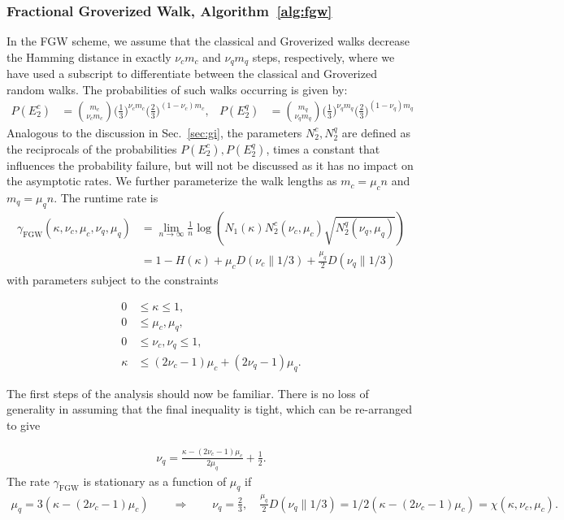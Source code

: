 \documentclass[a4paper,aps,floatfix]{revtex4}
\begin{document}
\subsubsection{Fractional Groverized Walk, Algorithm~\ref{alg:fgw}}

In the FGW scheme, we assume that the classical and Groverized walks decrease the Hamming distance in exactly $\nu_cm_c$ and $\nu_qm_q$ steps, respectively, where we have used a subscript to differentiate between the classical and Groverized random walks. 
The probabilities of such walks occurring is given by:
\begin{align}
    P(E^c_2) &= \binom{m_c}{\nu_c m_c}\Big(\frac13\Big)^{\nu_c m_c}\Big(\frac23\Big)^{(1-\nu_c)m_c},
    &
     P(E^q_2) &= \binom{m_q}{\nu_q m_q}\Big(\frac13\Big)^{\nu_q m_q}\Big(\frac23\Big)^{(1-\nu_q)m_q}
\end{align}
Analogous to the discussion in Sec.~\ref{sec:gi}, the parameters $N_2^c, N_2^q$ are defined as the reciprocals of the probabilities $P(E^c_2),P(E^q_2)$, times a constant that influences the probability failure, but will not be discussed as it has no impact on the asymptotic rates.
We further parameterize the walk lengths as $m_c = \mu_cn$ and $m_q = \mu_qn$. 
The runtime rate is
\begin{align}
    \gamma_{\textrm{FGW}}(\kappa,\nu_c,\mu_c,\nu_q,\mu_q) &= \lim_{n \rightarrow \infty} \frac1n \log\left(N_1(\kappa)N_2^c(\nu_c,\mu_c)\sqrt{N_2^q(\nu_q,\mu_q)}\right) \nonumber\\
    &= 
		1- H(\kappa) + \mu_cD(\nu_c\parallel 1/3) + 
		\frac{\mu_q}2D(\nu_q\parallel 1/3)
\end{align}
with parameters subject to the constraints

\begin{equation}
\label{constsFGW}
    \begin{aligned}
        0 &\le \kappa \le 1, \\
        0 &\le \mu_c,\mu_q, \\
        0 &\le \nu_c,\nu_q \le 1,\\
        \kappa &\leq (2\nu_c-1)\mu_c + (2\nu_q-1)\mu_q.
    \end{aligned}
\end{equation}

The first steps of the analysis should now be familiar.
There is no loss of generality in assuming that the final inequality is tight, which can be re-arranged to give

\begin{align*}
	\nu_q
	=
	\frac{\kappa - (2\nu_c-1)\mu_c}{2\mu_q} + \frac12.
\end{align*}
The rate $\gamma_{\mathrm{FGW}}$ is stationary as a function of $\mu_q$ if
\begin{align*}
	\mu_q = 3 (\kappa - (2\nu_c-1)\mu_c )
	\qquad\Rightarrow\qquad
	\nu_q = \frac23,
	\quad
	\frac{\mu_q}2D(\nu_q\parallel 1/3)
	=
	1/2 (\kappa - (2\nu_c-1)\mu_c ) 
	=
	\chi(\kappa,\nu_c,\mu_c).
\end{align*}
\end{document}
